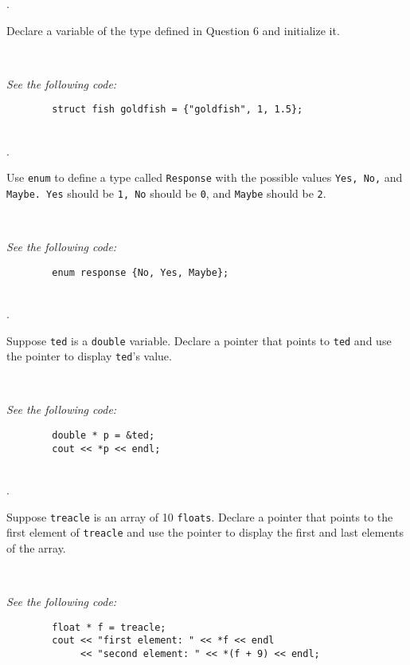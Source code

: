 \documentclass{amsart}
\begin{document}
. 
\begin{minipage}[t]{11.5 cm}
	Declare a variable of the type defined in Question 6 and initialize it.
\end{minipage} \\
\phantom{2. } 
\begin{minipage}[t]{11.5 cm}
	{\slshape See the following code:}
	\begin{verbatim}
		struct fish goldfish = {"goldfish", 1, 1.5};
	\end{verbatim}
\end{minipage} 
\\[.2cm]

. 
\begin{minipage}[t]{11.5 cm}
	Use \texttt{enum} to define a type called \texttt{Response} with the possible values \texttt{Yes, No,} and \texttt{Maybe. Yes} should be \texttt{1, No} should be \texttt{0}, and \texttt{Maybe} should be \texttt{2}.
\end{minipage} \\
\phantom{3. } 
\begin{minipage}[t]{11.5 cm}
	{\slshape See the following code:}
	\begin{verbatim}
		enum response {No, Yes, Maybe};
	\end{verbatim}
\end{minipage} 
\\[.2cm]

. 
\begin{minipage}[t]{11.5 cm}
	Suppose \texttt{ted} is a \texttt{double} variable. Declare a pointer that points to \texttt{ted} and use the pointer to display \texttt{ted}'s value.
\end{minipage} \\
\phantom{2. } 
\begin{minipage}[t]{11.5 cm}
	{\slshape See the following code:}
	\begin{verbatim}
		double * p = &ted;
		cout << *p << endl;
	\end{verbatim}
\end{minipage} 
\\[.2cm]

. 
\begin{minipage}[t]{11.5 cm}
	Suppose \texttt{treacle} is an array of 10 \texttt{floats}. Declare a pointer that points to the first element of \texttt{treacle} and use the pointer to display the first and last elements of the array. 
\end{minipage} \\
\phantom{3. } 
\begin{minipage}[t]{11.5 cm}
	{\slshape See the following code:}
	\begin{verbatim}
		float * f = treacle;
		cout << "first element: " << *f << endl
		     << "second element: " << *(f + 9) << endl;
	\end{verbatim}
\end{minipage} 
\\[.2cm]
\end{document}
